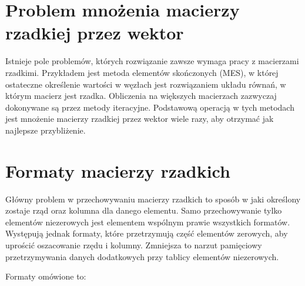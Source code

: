 \section{Problem mnożenia macierzy rzadkiej przez wektor}
\label{sec:macierzrzadkawektor}

Istnieje pole problemów, których rozwiązanie zawsze wymaga pracy z macierzami rzadkimi.
Przykładem jest metoda elementów skończonych (MES), w której ostateczne określenie wartości w węzłach jest rozwiązaniem układu równań, w którym macierz jest rzadka.
Obliczenia na większych macierzach zazwyczaj dokonywane są przez metody iteracyjne.
Podstawową operacją w tych metodach jest mnożenie macierzy rzadkiej przez wektor wiele razy, aby otrzymać jak najlepsze przybliżenie.

\section{Formaty macierzy rzadkich}
\label{sec:formatymacierzy}

Główny problem w przechowywaniu macierzy rzadkich to sposób w jaki określony zostaje rząd oraz kolumna dla danego elementu.
Samo przechowywanie tylko elementów niezerowych jest elementem wspólnym prawie wszystkich formatów.
Występują jednak formaty, które przetrzymują część elementów zerowych, aby uprościć oszacowanie rzędu i kolumny.
Zmniejsza to narzut pamięciowy przetrzymywania danych dodatkowych przy tablicy elementów niezerowych.

Formaty omówione to:

